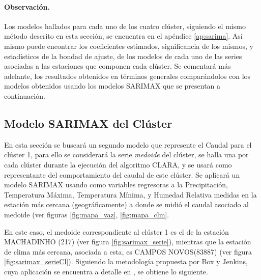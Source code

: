 \documentclass[12pt,oneside]{book}\usepackage[]{graphicx}\usepackage[]{color}
\theoremstyle{definition} %
\begin{document}
\paragraph{Observación.} Los modelos hallados para cada uno de los cuatro clúster, siguiendo el mismo método descrito en esta sección, se encuentra en el apéndice \ref{ap:sarima}. Así mismo puede encontrar los coeficientes estimados, significancia de los mismos, y estadísticos de la bondad de ajuste, de los modelos de cada uno de las series asociadas a las estaciones que componen cada clúster. Se comentará más adelante, los resultados obtenidos en términos generales comparándolos con los modelos obtenidos usando los modelos SARIMAX que se presentan a continuación.








\newpage


\subsection{Modelo SARIMAX del Clúster}

En esta sección se buscará un segundo modelo que represente el Caudal para el clúster 1, para ello se considerará la serie \textit{medoide} del clúster, se halla una por cada clúster durante la ejecución del algoritmo CLARA, y se usará como representante del comportamiento del caudal de este clúster. Se aplicará un modelo SARIMAX usando como variables regresoras a la Precipitación, Temperatura Máxima, Temperatura Mínima, y Humedad Relativa medidas en la estación más cercana (geográficamente) a donde se midió el caudal asociado al medoide (ver figuras \ref{fig:mapa_vaz}, \ref{fig:mapa_clm}.





En este caso, el medoide correspondiente al clúster 1 es el de la estación MACHADINHO (217) (ver figura \ref{fig:sarimax_serie}), mientras que la estación de clima más cercana, asociada a esta, es CAMPOS NOVOS(83887) (ver figura \ref{fig:sarimax_serieCl}). Siguiendo la metodología propuesta por Box y Jenkins, cuya aplicación se encuentra a detalle en \citeauthor{novales1993econometria} \citeyear{novales1993econometria}, se obtiene lo siguiente.
\end{document}
